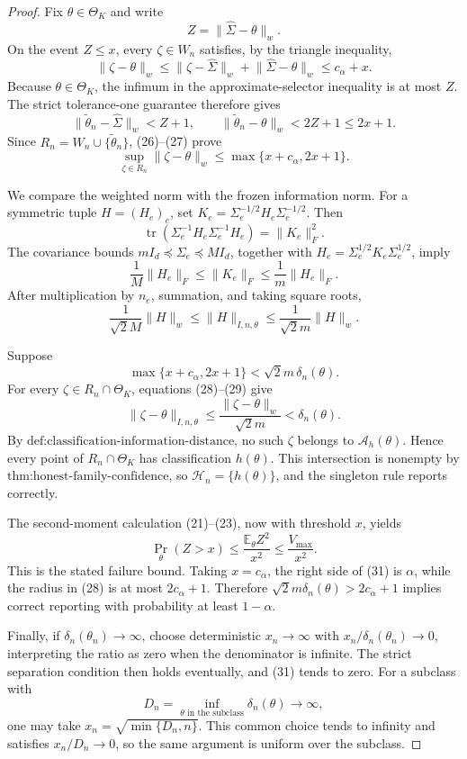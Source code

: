 \documentclass{article}
\begin{document}
\begin{proof}
Fix \(\theta\in\Theta_K\) and write
\[
 Z=\lVert\widehat\Sigma-\theta\rVert_w.
\]
On the event \(Z\le x\), every \(\zeta\in W_n\) satisfies, by the triangle inequality,
\[
 \lVert\zeta-\theta\rVert_w
 \le\lVert\zeta-\widehat\Sigma\rVert_w
   +\lVert\widehat\Sigma-\theta\rVert_w
 \le c_\alpha+x. \tag{26}
\]
Because \(\theta\in\Theta_K\), the infimum in the approximate-selector inequality is at most \(Z\).  The strict tolerance-one guarantee therefore gives
\[
 \lVert\widetilde\theta_n-\widehat\Sigma\rVert_w<Z+1,
 \qquad
 \lVert\widetilde\theta_n-\theta\rVert_w<2Z+1\le2x+1. \tag{27}
\]
Since \(R_n=W_n\cup\{\widetilde\theta_n\}\), (26)--(27) prove
\[
 \sup_{\zeta\in R_n}\lVert\zeta-\theta\rVert_w
 \le\max\{x+c_\alpha,2x+1\}. \tag{28}
\]

We compare the weighted norm with the frozen information norm.  For a symmetric tuple \(H=(H_e)_e\), set
\(K_e=\Sigma_e^{-1/2}H_e\Sigma_e^{-1/2}\).  Then
\[
 \operatorname{tr}(\Sigma_e^{-1}H_e\Sigma_e^{-1}H_e)=\lVert K_e\rVert_F^2.
\]
The covariance bounds \(mI_d\preceq\Sigma_e\preceq MI_d\), together with
\(H_e=\Sigma_e^{1/2}K_e\Sigma_e^{1/2}\), imply
\[
 \frac1M\lVert H_e\rVert_F\le\lVert K_e\rVert_F
 \le\frac1m\lVert H_e\rVert_F.
\]
After multiplication by \(n_e\), summation, and taking square roots,
\[
 \frac{1}{\sqrt2M}\lVert H\rVert_w
 \le\lVert H\rVert_{I,n,\theta}
 \le\frac{1}{\sqrt2m}\lVert H\rVert_w. \tag{29}
\]

Suppose
\[
 \max\{x+c_\alpha,2x+1\}<\sqrt2m\,\delta_n(\theta).
\]
For every \(\zeta\in R_n\cap\Theta_K\), equations (28)--(29) give
\[
 \lVert\zeta-\theta\rVert_{I,n,\theta}
 \le\frac{\lVert\zeta-\theta\rVert_w}{\sqrt2m}
 <\delta_n(\theta). \tag{30}
\]
By \(\text{def:classification-information-distance}\), no such \(\zeta\) belongs to \(\mathcal A_h(\theta)\).  Hence every point of \(R_n\cap\Theta_K\) has classification \(h(\theta)\).  This intersection is nonempty by \(\text{thm:honest-family-confidence}\), so \(\mathcal H_n=\{h(\theta)\}\), and the singleton rule reports correctly.

The second-moment calculation (21)--(23), now with threshold \(x\), yields
\[
 \Pr_\theta(Z>x)\le\frac{\mathbb E_\theta Z^2}{x^2}
 \le\frac{V_{\max}}{x^2}. \tag{31}
\]
This is the stated failure bound.  Taking \(x=c_\alpha\), the right side of (31) is \(\alpha\), while the radius in (28) is at most \(2c_\alpha+1\).  Therefore \(\sqrt2m\delta_n(\theta)>2c_\alpha+1\) implies correct reporting with probability at least \(1-\alpha\).

Finally, if \(\delta_n(\theta_n)\to\infty\), choose deterministic \(x_n\to\infty\) with \(x_n/\delta_n(\theta_n)\to0\), interpreting the ratio as zero when the denominator is infinite.  The strict separation condition then holds eventually, and (31) tends to zero.  For a subclass with
\[
 D_n=\inf_{\theta\text{ in the subclass}}\delta_n(\theta)\longrightarrow\infty,
\]
one may take \(x_n=\sqrt{\min\{D_n,n\}}\).  This common choice tends to infinity and satisfies \(x_n/D_n\to0\), so the same argument is uniform over the subclass.
\end{proof}
\end{document}
